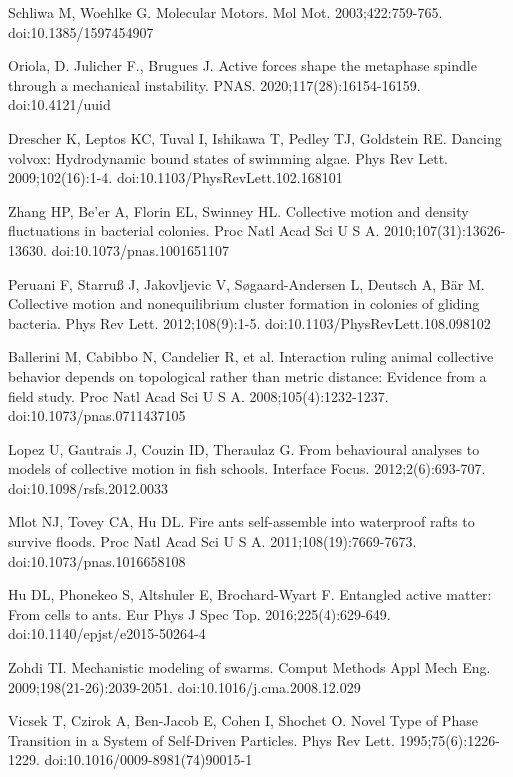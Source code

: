 \documentclass[11pt]{article}
\begin{document}
\newpage 
\begin{thebibliography}{9}

Schliwa M, Woehlke G. Molecular Motors. Mol Mot. 2003;422:759-765. doi:10.1385/1597454907

Oriola, D. Julicher F., Brugues J. Active forces shape the metaphase spindle through a mechanical instability. PNAS. 2020;117(28):16154-16159. doi:10.4121/uuid

Drescher K, Leptos KC, Tuval I, Ishikawa T, Pedley TJ, Goldstein RE. Dancing volvox: Hydrodynamic bound states of swimming algae. Phys Rev Lett. 2009;102(16):1-4. doi:10.1103/PhysRevLett.102.168101

Zhang HP, Be’er A, Florin EL, Swinney HL. Collective motion and density fluctuations in bacterial colonies. Proc Natl Acad Sci U S A. 2010;107(31):13626-13630. doi:10.1073/pnas.1001651107

Peruani F, Starruß J, Jakovljevic V, Søgaard-Andersen L, Deutsch A, Bär M. Collective motion and nonequilibrium cluster formation in colonies of gliding bacteria. Phys Rev Lett. 2012;108(9):1-5. doi:10.1103/PhysRevLett.108.098102

Ballerini M, Cabibbo N, Candelier R, et al. Interaction ruling animal collective behavior depends on topological rather than metric distance: Evidence from a field study. Proc Natl Acad Sci U S A. 2008;105(4):1232-1237. doi:10.1073/pnas.0711437105

Lopez U, Gautrais J, Couzin ID, Theraulaz G. From behavioural analyses to models of collective motion in fish schools. Interface Focus. 2012;2(6):693-707. doi:10.1098/rsfs.2012.0033

Mlot NJ, Tovey CA, Hu DL. Fire ants self-assemble into waterproof rafts to survive floods. Proc Natl Acad Sci U S A. 2011;108(19):7669-7673. doi:10.1073/pnas.1016658108

Hu DL, Phonekeo S, Altshuler E, Brochard-Wyart F. Entangled active matter: From cells to ants. Eur Phys J Spec Top. 2016;225(4):629-649. doi:10.1140/epjst/e2015-50264-4

Zohdi TI. Mechanistic modeling of swarms. Comput Methods Appl Mech Eng. 2009;198(21-26):2039-2051. doi:10.1016/j.cma.2008.12.029

Vicsek T, Czirok A, Ben-Jacob E, Cohen I, Shochet O. Novel Type of Phase Transition in a System of Self-Driven Particles. Phys Rev Lett. 1995;75(6):1226-1229. doi:10.1016/0009-8981(74)90015-1


\end{thebibliography}
\end{document}
